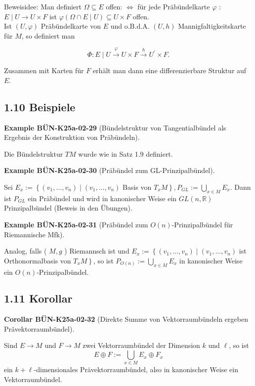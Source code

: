\documentclass[10pt, letterpaper]{article}
\newcommand{\CustomHeading}[3]{%
  \par\medskip\noindent%
  \textbf{#1 #2} \textnormal{(#3)}.\enskip%
}
\newenvironment{KORO}[2]{\begin{unitbox}\CustomHeading{Corollar}{#1}{#2}}{\end{unitbox}}
\newenvironment{EXA}[2]{\begin{unitbox}\CustomHeading{Example}{#1}{#2}}{\end{unitbox}}
\begin{document}
Beweisidee: Man definiert $\Omega \subseteq E$ offen: $\Leftrightarrow$ für jede Präbündelkarte $\varphi$ : $E \mid U \rightarrow U \times F$ ist $\varphi(\Omega \cap E \mid U) \subseteq U \times F$ offen.\\
Ist $(U, \varphi)$ Präbündelkarte von $E$ und o.B.d.A. $(U, h)$ Mannigfaltigkeitskarte für $M$, so definiert man

$$
\Phi: E \mid U \xrightarrow{\varphi} U \times F \xrightarrow{h} U^{\prime} \times F .
$$

Zusammen mit Karten für $F$ erhält man dann eine differenzierbare Struktur auf $E$.

\subsection*{1.10 Beispiele}
\begin{EXA}{BÜN-K25a-02-29}{Bündelstruktur von Tangentialbündel als Ergebnis der Konstruktion von Präbündeln}
Die Bündelstruktur $T M$ wurde wie in Satz 1.9 definiert.
\end{EXA}


\begin{EXA}{BÜN-K25a-02-30}{Präbündel zum GL-Prinzipalbündel}
Sei $E_{x}:=\left\{\left(v_{1}, \ldots, v_{n}\right) \mid\left(v_{1}, \ldots, v_{n}\right)\right.$ Basis von $\left.T_{x} M\right\}, P_{G L}:=\bigcup_{x \in M} E_{x}$. Dann ist $P_{G L}$ ein Präbündel und wird in kanonischer Weise ein $G L(n, \mathbb{R})$ Prinzipalbündel (Beweis in den Übungen).
\end{EXA}


\begin{EXA}{BÜN-K25a-02-31}{Präbündel zum $O(n)$-Prinzipalbündel für Riemannische Mfk}
Analog, falls ( $M, g$ ) Riemannsch ist und $E_{x}:=\left\{\left(v_{1}, \ldots, v_{n}\right) \mid\left(v_{1}, \ldots, v_{n}\right)\right.$ ist Orthonormalbasis von $\left.T_{x} M\right\}$, so ist $P_{O(n)}:=\bigcup_{x \in M} E_{x}$ in kanonischer Weise ein $O(n)$-Prinzipalbündel.
\end{EXA}


\subsection*{1.11 Korollar}

\begin{KORO}{BÜN-K25a-02-32}{Direkte Summe von Vektorraumbündeln ergeben Prävektorraumbündel}
Sind $E \rightarrow M$ und $F \rightarrow M$ zwei Vektorraumbündel der Dimension $k$ und $\ell$, so ist
$$
E \oplus F:=\bigcup_{x \in M} E_{x} \oplus F_{x}
$$
ein $k+\ell$-dimensionales Prävektorraumbündel, also in kanonischer Weise ein Vektorraumbündel.
\end{KORO}
\end{document}
